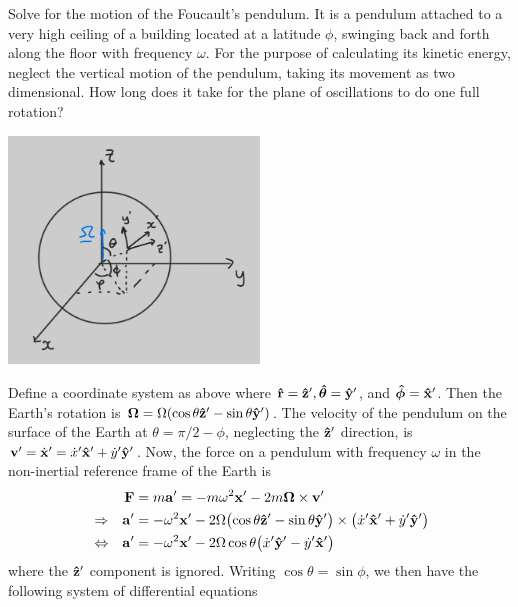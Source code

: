 \documentclass[12pt]{article}
\begin{document}
\begin{problem}{2}
Solve for the motion of the Foucault's pendulum. It is a pendulum attached to a
very high ceiling of a building located at a latitude $\phi$, swinging back and
forth along the floor with frequency $\omega$. For the purpose of calculating
its kinetic energy, neglect the vertical motion of the pendulum, taking its
movement as two dimensional. How long does it take for the plane of oscillations
to do one full rotation?
\begin{solution}
\begin{center}
    \includegraphics[width=0.5\textwidth]{hw8_p2.jpg} 
\end{center}
Define a coordinate system as above where $\vb{\hat{r}}=\vb{\hat{z}}',\bm{\hat{\theta}}=\vb{\hat{y}}'$, and
$\bm{\hat{\phi}}=\vb{\hat{x}}'$. Then the Earth's rotation is
$\bm\Omega=\Omega(\cos\theta\vb{\hat{z}}'-\sin\theta\vb{\hat{y}}')$. The velocity of the
pendulum on the surface of the Earth at $\theta=\pi /2-\phi$, neglecting the
$\vb{\hat{z}}'$ direction, is $\vb{v}'=\dot{\vb{x}}'=\dot{x}'\vb{\hat{x}}'+\dot{y}'\vb{\hat{y}}'$. 
Now, the force on a pendulum with frequency $\omega$ in the non-inertial 
reference frame of the Earth is
\begin{align}
    &&\vb{F}&=m\vb{a}'=-m\omega^2\vb{x}'-2m\bm\Omega\times\vb{v}'\notag\\
    &\Rightarrow&\vb{a}'
    &=-\omega^2\vb{x}'-2\Omega\qty(\cos\theta\vb{\hat{z}}'-\sin\theta\vb{\hat{y}}')
    \times\qty(\dot{x}'\vb{\hat{x}}'+\dot{y}'\vb{\hat{y}}')\notag\\
    &\Leftrightarrow&\vb{a}'
    &=-\omega^2\vb{x}'-2\Omega\cos\theta\qty(\dot{x}'\vb{\hat{y}}'-\dot{y}'\vb{\hat{x}}')
\end{align}
where the $\vb{\hat{z}}'$ component is ignored. Writing $\cos\theta=\sin\phi$, we then
have the following system of differential equations
\begin{subequations}

\end{subequations}
\end{solution}
\end{problem}
\end{document}

